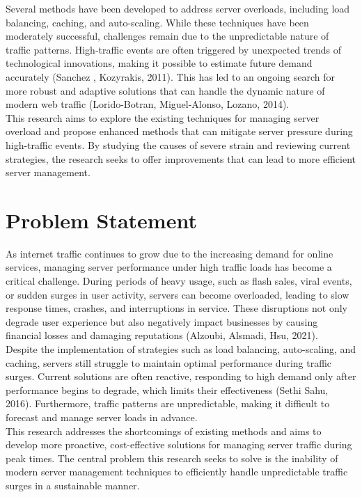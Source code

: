 \documentclass[a4paper, 12pt]{article}
\begin{document}
Several methods have been developed to address server overloads, including load balancing, caching, and auto-scaling. While these techniques have been moderately successful, challenges remain due to the unpredictable nature of traffic patterns. High-traffic events are often triggered by unexpected trends of technological innovations, making it possible to estimate future demand accurately  (Sanchez , Kozyrakis, 2011).
This has led to an ongoing search for more robust and adaptive solutions that can handle the dynamic nature of modern web traffic (Lorido-Botran, Miguel-Alonso,  Lozano, 2014).\\

This research aims to explore the existing techniques for managing server overload and propose enhanced methods that can mitigate server pressure during high-traffic events. By studying the causes of severe strain and reviewing current strategies, the research seeks to offer improvements that can lead to more efficient server management.\\

\section{Problem Statement}
As internet traffic continues to grow due to the increasing demand for online services, managing server performance under high traffic loads has become a critical challenge. During periods of heavy usage, such as flash sales, viral events, or sudden surges in user activity, servers can become overloaded, leading to slow response times, crashes, and interruptions in service. These disruptions not only degrade user experience but also negatively impact businesses by causing financial losses and damaging reputations (Alzoubi, Alsmadi,  Hsu, 2021).\\

Despite the implementation of strategies such as load balancing, auto-scaling, and caching, servers still struggle to maintain optimal performance during traffic surges. Current solutions are often reactive, responding to high demand only after performance begins to degrade, which limits their effectiveness (Sethi  Sahu, 2016). Furthermore, traffic patterns are unpredictable, making it difficult to forecast and manage server loads in advance.
\\
This research addresses the shortcomings of existing methods and aims to develop more proactive, cost-effective solutions for managing server traffic during peak times.
The central problem this research seeks to solve is the inability of modern server management techniques to efficiently handle unpredictable traffic surges in a sustainable manner.
\end{document}
